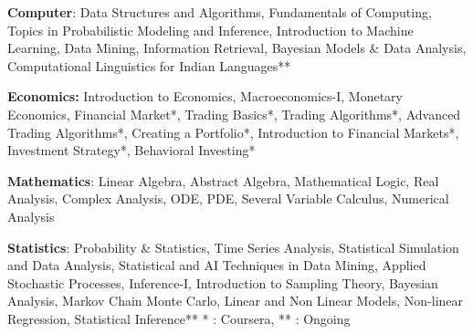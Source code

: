 \vspace{3mm}
\begin{cvitems}
  \item \textbf{Computer}: Data Structures and Algorithms, Fundamentals of Computing, 
  Topics in Probabilistic Modeling and Inference, Introduction to Machine Learning,
  Data Mining, Information Retrieval, Bayesian Models \& Data Analysis, Computational Linguistics for Indian Languages**
  \item \textbf{Economics:} Introduction to Economics, Macroeconomics-I, Monetary Economics,  Financial Market*, Trading Basics*, Trading Algorithms*, Advanced Trading
  Algorithms*, Creating a Portfolio*, Introduction to Financial Markets*, Investment Strategy*,
  Behavioral Investing*
  \item \textbf{Mathematics}: Linear Algebra, Abstract Algebra, Mathematical Logic, Real Analysis, 
  Complex Analysis, ODE, PDE, Several Variable Calculus, Numerical Analysis
  \item \textbf{Statistics}: Probability \& Statistics, Time Series Analysis, Statistical
Simulation and Data Analysis, ​Statistical and AI Techniques in Data Mining, 
Applied Stochastic Processes, Inference-I, Introduction to Sampling Theory, Bayesian Analysis, Markov Chain Monte Carlo, Linear and Non Linear
Models, Non-linear Regression, Statistical Inference**
{\small{* : Coursera, ** : Ongoing}}
\end{cvitems}
\vspace{2mm}
